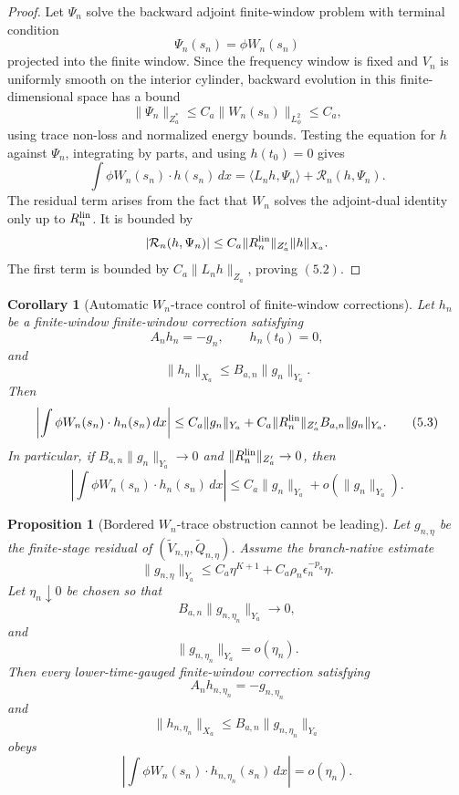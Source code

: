 \documentclass[11pt]{article}
\numberwithin{equation}{section}
\theoremstyle{plain}
\newtheorem{proposition}{Proposition}[section]
\newtheorem{corollary}{Corollary}[section]
\theoremstyle{definition}
\theoremstyle{remark}
\newcommand{\dx}{\,dx}
\begin{document}
\begin{proof}
Let \(\Psi_n\) solve the backward adjoint finite-window problem with terminal condition
\[
        \Psi_n(s_n)=\phi W_n(s_n)
\]
projected into the finite window.  Since the frequency window is fixed and \(V_n\) is uniformly smooth on the interior cylinder, backward evolution in this finite-dimensional space has a bound
\[
        \|\Psi_n\|_{Z_a^*}\le C_a\|W_n(s_n)\|_{L^2_\phi}\le C_a,
\]
using trace non-loss and normalized energy bounds.  Testing the equation for \(h\) against \(\Psi_n\), integrating by parts, and using \(h(t_0)=0\) gives
\[
        \int \phi W_n(s_n)\cdot h(s_n)\dx
        =
        \langle L_nh,\Psi_n\rangle
        +
        \mathcal R_n(h,\Psi_n).
\]
The residual term arises from the fact that \(W_n\) solves the adjoint-dual identity only up to \(R_n^{\rm lin}\).  It is bounded by
\[
        |\mathcal R_n(h,\Psi_n)|
        \le
        C_a\|R_n^{\rm lin}\|_{Z_a'}\|h\|_{X_a}.
\]
The first term is bounded by \(C_a\|L_nh\|_{Z_a}\), proving \((5.2)\).
\end{proof}

\begin{corollary}[Automatic \(W_n\)-trace control of finite-window corrections]
\label{pV:cor:automatic-W-trace-control}
Let \(h_n\) be a finite-window finite-window correction satisfying
\[
        A_nh_n=-g_n,
        \qquad
        h_n(t_0)=0,
\]
and
\[
        \|h_n\|_{X_a}\le B_{a,n}\|g_n\|_{Y_a}.
\]
Then
\[
        \left|
        \int\phi W_n(s_n)\cdot h_n(s_n)\dx
        \right|
        \le
        C_a\|g_n\|_{Y_a}
        +
        C_a\|R_n^{\rm lin}\|_{Z_a'}B_{a,n}\|g_n\|_{Y_a}.
        \tag{5.3}
\]
In particular, if \(B_{a,n}\|g_n\|_{Y_a}\to0\) and \(\|R_n^{\rm lin}\|_{Z_a'}\to0\), then
\[
        \left|
        \int\phi W_n(s_n)\cdot h_n(s_n)\dx
        \right|
        \le C_a\|g_n\|_{Y_a}+o(\|g_n\|_{Y_a}).
\]
\end{corollary}

\begin{proposition}[Bordered \(W_n\)-trace obstruction cannot be leading]
\label{pV:prop:bordered-W-trace-obstruction-not-leading-expanded}
Let \(g_{n,\eta}\) be the finite-stage residual of
\((\widetilde V_{n,\eta},\widetilde Q_{n,\eta})\).  Assume the branch-native estimate
\[
        \|g_{n,\eta}\|_{Y_a}
        \le
        C_a\eta^{K+1}+C_a\rho_n\epsilon_n^{-p_a}\eta.
        \tag{7.1}
\]
Let \(\eta_n\downarrow0\) be chosen so that
\[
        B_{a,n}\|g_{n,\eta_n}\|_{Y_a}\to0,
        \tag{7.2}
\]
and
\[
        \|g_{n,\eta_n}\|_{Y_a}=o(\eta_n).
        \tag{7.3}
\]
Then every lower-time-gauged finite-window correction satisfying
\[
        A_nh_{n,\eta_n}=-g_{n,\eta_n}
\]
and
\[
        \|h_{n,\eta_n}\|_{X_a}\le B_{a,n}\|g_{n,\eta_n}\|_{Y_a}
\]
obeys
\[
        \left|
        \int\phi W_n(s_n)\cdot h_{n,\eta_n}(s_n)\,dx
        \right|
        =o(\eta_n).
        \tag{7.4}
\]
\end{proposition}
\end{document}
